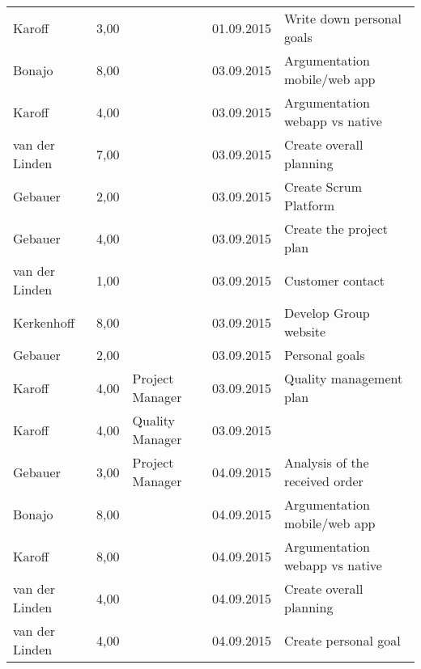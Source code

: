 \begin{longtable}{ l r p{2cm} c p{4cm} }
		Karoff                  & 3,00           &                 & 01.09.2015    & Write down personal goals                    \\
		Bonajo                  & 8,00           &                 & 03.09.2015    & Argumentation mobile/web app                 \\
		Karoff                  & 4,00           &                 & 03.09.2015    & Argumentation webapp vs native               \\
		van der Linden          & 7,00           &                 & 03.09.2015    & Create overall planning                      \\
		Gebauer                 & 2,00           &                 & 03.09.2015    & Create Scrum Platform                        \\
		Gebauer                 & 4,00           &                 & 03.09.2015    & Create the project plan                      \\
		van der Linden          & 1,00           &                 & 03.09.2015    & Customer contact                             \\
		Kerkenhoff              & 8,00           &                 & 03.09.2015    & Develop Group website                         \\
		Gebauer                 & 2,00           &                 & 03.09.2015    & Personal goals                               \\
		Karoff                  & 4,00           & Project Manager & 03.09.2015    & Quality management plan                      \\
		Karoff                  & 4,00           & Quality Manager & 03.09.2015    &                                              \\
		Gebauer                 & 3,00           & Project Manager & 04.09.2015    & Analysis of the received order               \\
		Bonajo                  & 8,00           &                 & 04.09.2015    & Argumentation mobile/web app                 \\
		Karoff                  & 8,00           &                 & 04.09.2015    & Argumentation webapp vs native               \\
		van der Linden          & 4,00           &                 & 04.09.2015    & Create overall planning                      \\
		van der Linden          & 4,00           &                 & 04.09.2015    & Create personal goal                         \\

\end{longtable}
